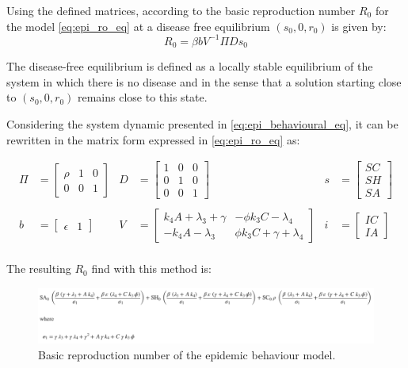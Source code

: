 Using the defined matrices, according to \cite{arino2007} the basic reproduction number $R_0$ for the model \ref{eq:epi_ro_eq} at a disease free equilibrium $(s_0, 0, r_0)$ is given by:
\begin{equation}
R_0 = \beta b V^{-1} \Pi D s_0
\label{eq:R_0_eqn}
\end{equation}

The disease-free equilibrium is defined as a locally stable equilibrium of the system in which there is no disease and in the sense that a solution starting close to $(s_0, 0, r_0)$ remains close to this state. 

Considering the system dynamic presented in \ref{eq:epi_behavioural_eq}, it can be rewritten in the matrix form expressed in  \ref{eq:epi_ro_eq} as: 

\begin{align*}
\Pi & = 
\begin{bmatrix}
	\rho & 1 & 0 \\
	0 & 0 & 1
\end{bmatrix} &
D & = 
\begin{bmatrix}
	1 & 0 & 0 \\
	0 & 1 & 0\\
	0 & 0 & 1
\end{bmatrix} & 
s & = 
\begin{bmatrix}
	SC \\
	SH\\
	SA 
\end{bmatrix} \\
\\
b & = \begin{bmatrix}
	\epsilon & 1
\end{bmatrix} & 
V & = 
\begin{bmatrix}
	k_4 A + \lambda_3 + \gamma & - \phi k_3  C - \lambda_4\\
	- k_4 A - \lambda_3 & \phi k_3 C + \gamma + \lambda_4
\end{bmatrix} & 
i & = 
\begin{bmatrix}
	IC \\
	IA
\end{bmatrix}
\\
\end{align*}


The resulting $R_0$ find with this method is: 
\begin{figure}
	\centering
	\includegraphics[width=0.99\linewidth]{1_corpo/figure/r0/ro_epidemic_behavioural}
	\caption[reproduction number of epidemic behaviour model.]{Basic reproduction number of the epidemic behaviour model.}
	\label{fig:roepidemicbehavioural}
\end{figure}



